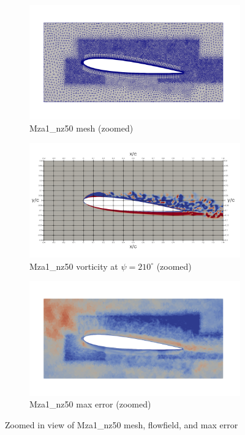 \begin{figure}[H]
	\centering
\begin{subfigure}[b]{0.7\textwidth}
	\centering
	\includegraphics[width=1\textwidth]{figures/adapt_strat/zoomed/Mza1_mesh.png}
	\caption{Mza1\_nz50 mesh (zoomed)}
	\label{fig:Mza1_mesh_zoomed}
\end{subfigure}
\begin{subfigure}[b]{0.7\textwidth}
	\centering
	\includegraphics[width=1\textwidth]{figures/adapt_strat/zoomed/Mza1_ph_210.png}
	\caption{Mza1\_nz50 vorticity at $\psi=210^\circ$ (zoomed)}
	\label{fig:Mza1_vorticity_zoomed}
\end{subfigure}
\begin{subfigure}[b]{0.7\textwidth}
	\centering
	\includegraphics[width=1\textwidth]{figures/adapt_strat/zoomed/Mza1_max_error.png}
	\caption{Mza1\_nz50 max error (zoomed)}
	\label{fig:Mza1_max_error_zoomed}
\end{subfigure}


\label{fig:Mza1_zoomed}
\caption{Zoomed in view of Mza1\_nz50 mesh, flowfield, and max error}
\end{figure}

